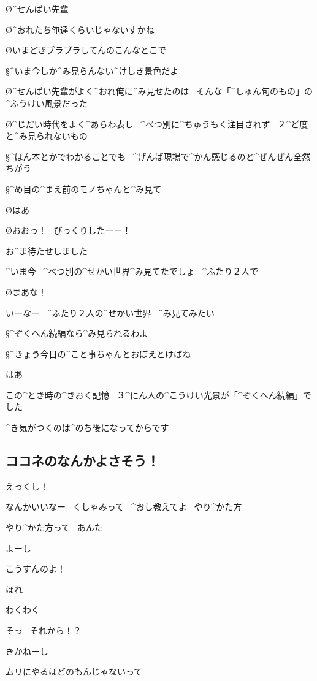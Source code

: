 \page
\O ^{せんぱい}{先輩}

\O ^{おれたち}{俺達}くらいじゃないすかね

\O いまどきブラブラしてんのこんなとこで

\S ^{いま}{今}しか^{み}{見}らんない^{けしき}{景色}だよ

\O ^{せんぱい}{先輩}がよく^{おれ}{俺}に^{み}{見}せたのは
\ そんな「^{しゅん}{旬}のもの」の^{ふうけい}{風景}だった

\O ^{じだい}{時代}をよく^{あらわ}{表}し
\ ^{べつ}{別}に^{ちゅうもく}{注目}されず
\ ２^{ど}{度}と^{み}{見}られないもの

\page
\S ^{ほん}{本}とかでわかることでも
\ ^{げんば}{現場}で^{かん}{感}じるのと^{ぜんぜん}{全然}ちがう

\S ^{め}{目}の^{まえ}{前}のモノちゃんと^{み}{見}て

\page
\O はあ

\page
\O おおっ！
\ びっくりしたーー！

\A お^{ま}{待}たせしました

\A ^{いま}{今}
\ ^{べつ}{別}の^{せかい}{世界}^{み}{見}てたでしょ
\ ^{ふたり}{２人}で

\O まあな！

\page
\A いーなー
\ ^{ふたり}{２人}の^{せかい}{世界}
\ ^{み}{見}てみたい

\S ^{ぞくへん}{続編}なら^{み}{見}られるわよ

\S ^{きょう}{今日}の^{こと}{事}ちゃんとおぼえとけばね

\A はあ

\page
\A この^{とき}{時}の^{きおく}{記憶}
\ ３^{にん}{人}の^{こうけい}{光景}が「^{ぞくへん}{続編}」でした

\A ^{き}{気}がつくのは^{のち}{後}になってからです


\subsection{ココネのなんかよさそう！}

\SH えっくし！

\K なんかいいなー
\ くしゃみって
\ ^{おし}{教}えてよ
\ やり^{かた}{方}

\SH やり^{かた}{方}って
\ あんた

\SH よーし

\SH こうすんのよ！

\SH ほれ

\K わくわく

\K そっ
\ それから！？

\SH きかねーし

\SH ムリにやるほどのもんじゃないって
